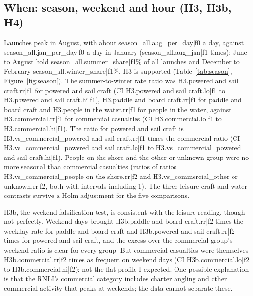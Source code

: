 \documentclass[11pt,a4paper]{article}
\begin{document}
\subsection{When: season, weekend and hour (H3, H3b, H4)}
Launches peak in August, with about {{season_all.aug_per_day|f0}} a day, against {{season_all.jan_per_day|f0}} a day in January ({{season_all.aug_jan|f1}} times); June to August hold {{season_all.summer_share|f1}}\% of all launches and December to February {{season_all.winter_share|f1}}\%. H3 is supported (Table~\ref{tab:season}, Figure~\ref{fig:season}). The summer-to-winter rate ratio was {{H3.powered and sail craft.rr|f1}} for powered and sail craft (CI {{H3.powered and sail craft.lo|f1}} to {{H3.powered and sail craft.hi|f1}}), {{H3.paddle and board craft.rr|f1}} for paddle and board craft and {{H3.people in the water.rr|f1}} for people in the water, against {{H3.commercial.rr|f1}} for commercial casualties (CI {{H3.commercial.lo|f1}} to {{H3.commercial.hi|f1}}). The ratio for powered and sail craft is {{H3.vs_commercial_powered and sail craft.rr|f1}} times the commercial ratio (CI {{H3.vs_commercial_powered and sail craft.lo|f1}} to {{H3.vs_commercial_powered and sail craft.hi|f1}}). People on the shore and the other or unknown group were no more seasonal than commercial casualties (ratios of ratios {{H3.vs_commercial_people on the shore.rr|f2}} and {{H3.vs_commercial_other or unknown.rr|f2}}, both with intervals including 1). The three leisure-craft and water contrasts survive a Holm adjustment for the five comparisons.

H3b, the weekend falsification test, is consistent with the leisure reading, though not perfectly. Weekend days brought {{H3b.paddle and board craft.rr|f2}} times the weekday rate for paddle and board craft and {{H3b.powered and sail craft.rr|f2}} times for powered and sail craft, and the excess over the commercial group's weekend ratio is clear for every group. But commercial casualties were themselves {{H3b.commercial.rr|f2}} times as frequent on weekend days (CI {{H3b.commercial.lo|f2}} to {{H3b.commercial.hi|f2}}): not the flat profile I expected. One possible explanation is that the RNLI's commercial category includes charter angling and other commercial activity that peaks at weekends; the data cannot separate these.
\end{document}

